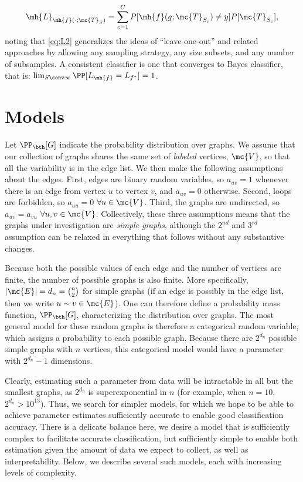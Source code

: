 \begin{align} \label{eq:L2}
	\mh{L}_{\mh{f}(\cdot; \mc{T}_S)} = \sum_{c=1}^C P[\mh{f}(g; \mc{T}_{S_c}) \neq y]  P[\mc{T}_{S_c}],
\end{align}
noting that \eqref{eq:L2} generalizes the ideas of ``leave-one-out'' and related approaches by allowing any sampling strategy, any size subsets, and any number of subsamples.  %
A consistent classifier is one that converges to Bayes classifier, that is: $\lim_{S\conv \infty} \PP[L_{\mh{f}}=L_{f^*}]=1$.


\section{Models} %
\label{sub:models}

Let $\PP_{\bth}[G]$ indicate the probability distribution over graphs.  We assume that our collection of graphs shares the same set of \emph{labeled} vertices, $\mc{V}$, so that all the variability is in the edge list.  We then make the following assumptions about the edges.  First, edges are binary random variables, so $a_{uv}=1$ whenever there is an edge from vertex $u$ to vertex $v$, and $a_{uv}=0$ otherwise.  Second, loops are forbidden, so $a_{uu}=0$ $\forall u \in \mc{V}$.  Third, the graphs are undirected, so $a_{uv}=a_{vu}$ $\forall u,v \in \mc{V}$. Collectively, these three assumptions means that the graphs under investigation are \emph{simple graphs}, although the $2^{nd}$ and $3^{rd}$ assumption can be relaxed in everything that follows without any substantive changes. 
 
Because both the possible values of each edge and the number of vertices are finite, the number of possible graphs is also finite.  More specifically, $|\mc{E}|=d_n=\binom{n}{2}$ for simple graphs (if an edge is possibly in the edge list, then we write $u \sim v \in \mc{E}$).  One can therefore define a probability mass function, $\PP_{\bth}[G]$, characterizing the distribution over graphs.  The most general model for these random graphs is therefore a categorical random variable, which assigns a probability to each possible graph.  Because there are $2^{d_n}$ possible simple graphs with $n$ vertices, this categorical model would have a parameter with $2^{d_n}-1$ dimensions.  

Clearly, estimating such a parameter from data will be intractable in all but the smallest graphs, as $2^{d_n}$ is superexponential in $n$ (for example, when $n=10$, $2^{d_n}>10^13$).  Thus, we search for simpler models, for which we hope to be able to achieve parameter estimates sufficiently accurate to enable good classification accuracy.  There is a delicate balance here, we desire a model that is sufficiently complex to facilitate accurate classification, but sufficiently simple to enable both estimation given the amount of data we expect to collect, as well as interpretability.  Below, we describe several such models, each with increasing levels of complexity.




